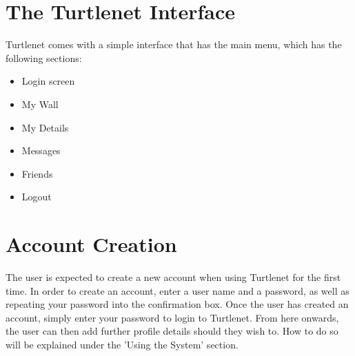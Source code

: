 \section{The Turtlenet Interface}
Turtlenet comes with a simple interface that has the main menu, which has the
following sections:
\begin{itemize}
\item Login screen
\item My Wall
\item My Details
\item Messages
\item Friends
\item Logout
\end{itemize}

\section{Account Creation}
The user is expected to create a new account when using Turtlenet for the first
time.  In order to create an account, enter a user name and a password, as well
as repeating your password into the confirmation box.  Once the user has 
created an account, simply enter your password to login to Turtlenet.  From here
onwards, the user can then add further profile details should they wish to.  
How to do so will be explained under the 'Using the System' section.